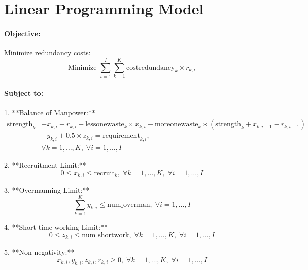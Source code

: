 \documentclass{article}
\begin{document}
\section*{Linear Programming Model}

\paragraph{Objective:}
Minimize redundancy costs:
\[
\text{Minimize } \sum_{i=1}^{I} \sum_{k=1}^{K} \text{costredundancy}_k \times r_{k,i}
\]

\paragraph{Subject to:}

1. **Balance of Manpower:**
   \begin{align*}
   \text{strength}_{k} & + x_{k,i} - r_{k,i} - \text{lessonewaste}_k \times x_{k,i} - \text{moreonewaste}_k \times (\text{strength}_{k} + x_{k,i-1} - r_{k,i-1}) \\
   & + y_{k,i} + 0.5 \times z_{k,i} = \text{requirement}_{k,i}, \\
   & \forall k = 1, \ldots, K, \; \forall i = 1, \ldots, I
   \end{align*}

2. **Recruitment Limit:**
   \[
   0 \leq x_{k,i} \leq \text{recruit}_{k}, \; \forall k = 1, \ldots, K, \; \forall i = 1, \ldots, I
   \]

3. **Overmanning Limit:**
   \[
   \sum_{k=1}^{K} y_{k,i} \leq \text{num\_overman}, \; \forall i = 1, \ldots, I
   \]

4. **Short-time working Limit:**
   \[
   0 \leq z_{k,i} \leq \text{num\_shortwork}, \; \forall k = 1, \ldots, K, \; \forall i = 1, \ldots, I
   \]

5. **Non-negativity:**
   \[
   x_{k,i}, y_{k,i}, z_{k,i}, r_{k,i} \geq 0, \; \forall k = 1, \ldots, K, \; \forall i = 1, \ldots, I
   \]
\end{document}
